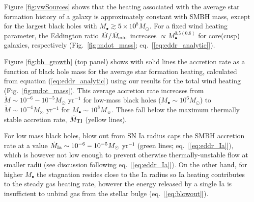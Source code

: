 \documentclass[usenatbib,fleqn]{mn2e}
\begin{document}
Figure \ref{fig:vwSources} shows that the heating associated with the
average star formation history of a galaxy is approximately constant
with SMBH mass, except for the largest black holes with $M_{\bullet}
\gtrsim 5\times 10^{8}M_{\odot}$.  For a fixed wind heating parameter,
the Eddington ratio $\dot{M}/\dot{M}_{\rm edd}$ increases $\propto
M_{\bullet}^{0.5(0.8)}$ for core(cusp) galaxies, respectively
(Fig.~\ref{fig:mdot_mass}; eq.~[\ref{eq:eddr_analytic}]).

Figure \ref{fig:bh_growth} (top panel) shows with solid lines the
accretion rate as a function of black hole mass for the average star
formation heating, calculated from equation (\ref{eq:eddr_analytic})
using our results for the total wind heating
(Fig.~\ref{fig:mdot_mass}).  This average accretion rate increases
from $\dot{M} \sim 10^{-6}-10^{-5}M_{\odot}$ yr$^{-1}$ for low-mass
black holes ($M_{\bullet} \sim 10^{6}M_{\odot}$) to $\dot{M} \sim
10^{-4}M_{\odot}$ yr$^{-1}$ for $M_{\bullet} \sim 10^{8}M_{\sun}$.
These fall below the maximum thermally stable accretion rate,
$\dot{M}_{\rm TI}$ (yellow lines).


For low mass black holes, blow out from SN Ia radius caps the SMBH
accretion rate at a value $\dot{M}_{\rm Ia} \sim
10^{-6}-10^{-5}M_{\odot}$ yr$^{-1}$ (green lines;
eq.~[\ref{eq:eddr_Ia}]), which is however not low enough to prevent
otherwise thermally-unstable flow at smaller radii (see discussion
following eq.~[\ref{eq:eddr_Ia}]).  On the other hand, for higher
$M_{\bullet}$ the stagnation resides close to the Ia radius so Ia
heating contributes to the steady gas heating rate, however the energy
released by a single Ia is insufficient to unbind gas from the stellar
bulge (eq.~[\ref{eq:blowout}]).

\end{document}
